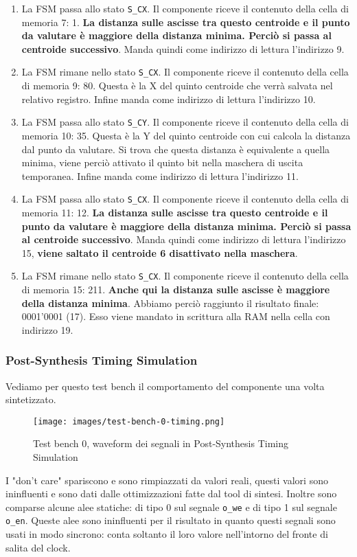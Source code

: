 \documentclass{article}
\begin{document}
\begin{enumerate}
    \item La FSM passa allo stato \verb^S_CX^. Il componente riceve il contenuto della cella di memoria 7: 1. \textbf{La distanza sulle ascisse tra questo centroide e il punto da valutare è maggiore della distanza minima. Perciò si passa al centroide successivo}. Manda quindi come indirizzo di lettura l'indirizzo 9.
    \item La FSM rimane nello stato \verb^S_CX^. Il componente riceve il contenuto della cella di memoria 9: 80. Questa è la X del quinto centroide che verrà salvata nel relativo registro. Infine manda come indirizzo di lettura l'indirizzo 10.
    \item La FSM passa allo stato \verb^S_CY^. Il componente riceve il contenuto della cella di memoria 10: 35. Questa è la Y del quinto centroide con cui calcola la distanza dal punto da valutare. Si trova che questa distanza è equivalente a quella minima, viene perciò attivato il quinto bit nella maschera di uscita temporanea. Infine manda come indirizzo di lettura l'indirizzo 11.
    \item La FSM passa allo stato \verb^S_CX^. Il componente riceve il contenuto della cella di memoria 11: 12. \textbf{La distanza sulle ascisse tra questo centroide e il punto da valutare è maggiore della distanza minima. Perciò si passa al centroide successivo}. Manda quindi come indirizzo di lettura l'indirizzo 15, \textbf{viene saltato il centroide 6 disattivato nella maschera}.
    \item La FSM rimane nello stato \verb^S_CX^. Il componente riceve il contenuto della cella di memoria 15: 211. \textbf{Anche qui la distanza sulle ascisse è maggiore della distanza minima}. Abbiamo perciò raggiunto il risultato finale: 0001'0001 (17). Esso viene mandato in scrittura alla RAM nella cella con indirizzo 19.
\end{enumerate}

\subsubsection{Post-Synthesis Timing Simulation}
Vediamo per questo test bench il comportamento del componente una volta sintetizzato.
\begin{figure}[H]
    \centering
    \caption{Test bench 0, waveform dei segnali in Post-Synthesis Timing Simulation}
    \texttt{[image: images/test-bench-0-timing.png]}
    \label{fig:test-bench-0-timing}
\end{figure}
\noindent I "don't care" spariscono e sono rimpiazzati da valori reali, questi valori sono ininfluenti e sono dati dalle ottimizzazioni fatte dal tool di sintesi. Inoltre sono comparse alcune alee statiche: di tipo 0 sul segnale \verb^o_we^ e di tipo 1 sul segnale \verb^o_en^. Queste alee sono ininfluenti per il risultato in quanto questi segnali sono usati in modo sincrono: conta soltanto il loro valore nell'intorno del fronte di salita del clock.
\end{document}
